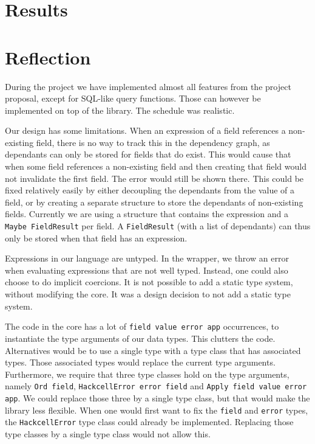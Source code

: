 \documentclass{article}
\begin{document}
	\section{Results}
	
	\section{Reflection}
	During the project we have implemented almost all features from the project proposal, except for SQL-like query functions. Those can however be implemented on top of the library. The schedule was realistic.
	
	Our design has some limitations. When an expression of a field references a non-existing field, there is no way to track this in the dependency graph, as dependants can only be stored for fields that do exist. This would cause that when some field references a non-existing field and then creating that field would not invalidate the first field. The error would still be shown there. This could be fixed relatively easily by either decoupling the dependants from the value of a field, or by creating a separate structure to store the dependants of non-existing fields. Currently we are using a structure that contains the expression and a \texttt{Maybe FieldResult} per field. A \texttt{FieldResult} (with a list of dependants) can thus only be stored when that field has an expression.
	
	Expressions in our language are untyped. In the wrapper, we throw an error when evaluating expressions that are not well typed. Instead, one could also choose to do implicit coercions. It is not possible to add a static type system, without modifying the core. It was a design decision to not add a static type system.
	
	The code in the core has a lot of \texttt{field value error app} occurrences, to instantiate the type arguments of our data types. This clutters the code. Alternatives would be to use a single type with a type class that has associated types. Those associated types would replace the current type arguments. Furthermore, we require that three type classes hold on the type arguments, namely \texttt{Ord field}, \texttt{HackcellError error field} and \texttt{Apply field value error app}. We could replace those three by a single type class, but that would make the library less flexible. When one would first want to fix the \texttt{field} and \texttt{error} types, the \texttt{HackcellError} type class could already be implemented. Replacing those type classes by a single type class would not allow this.
	
	
	
\end{document}
